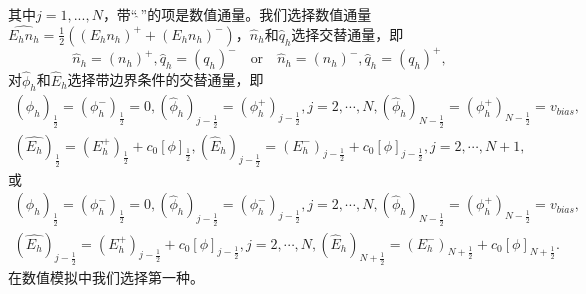 其中$j = 1,...,N$，带“$\widehat{\ }$”的项是数值通量。我们选择数值通量$\widehat{E_h n_h} = \frac{1}{2}((E_hn_h)^+  + (E_hn_h)^-)$，$\hat{n}_h$和$\hat{q}_h$选择交替通量，即
\begin{equation}
    \hat{n}_h = (n_h)^+, \hat{q}_h = (q_h)^- \quad \text{or} \quad \hat{n}_h = (n_h)^-, \hat{q}_h = (q_h)^+, \label{numbericalFlux:n&q}
\end{equation}
对$\hat{\phi}_h$和$\hat{E}_h$选择带边界条件的交替通量，即
\begin{equation}
    \begin{aligned}
        (\hat{\phi}_h)_{\frac{1}{2}} = (\phi_h^-)_{\frac{1}{2}} = 0, (\hat{\phi}_h)_{j-\frac{1}{2}} = (\phi_h^+)_{j-\frac{1}{2}},j = 2,\cdots,N,(\hat{\phi}_h)_{N-\frac{1}{2}} = (\phi_h^+)_{N-\frac{1}{2}} = v_{bias}, \\
        (\hat{E_h})_{\frac{1}{2}} = (E_h^+)_{\frac{1}{2}} + c_0[\phi]_{\frac{1}{2}}, (\hat{E}_h)_{j-\frac{1}{2}} = (E_h^-)_{j-\frac{1}{2}} + c_0[\phi]_{j-\frac{1}{2}},j = 2,\cdots,N+1,
    \end{aligned}\label{numbericalFlux:phi&E}
\end{equation}
或
\begin{equation}
    \begin{aligned}
        (\hat{\phi}_h)_{\frac{1}{2}} = (\phi_h^-)_{\frac{1}{2}} = 0, (\hat{\phi}_h)_{j-\frac{1}{2}} = (\phi_h^-)_{j-\frac{1}{2}},j = 2,\cdots,N,(\hat{\phi}_h)_{N-\frac{1}{2}} = (\phi_h^+)_{N-\frac{1}{2}} = v_{bias}, \\
        (\hat{E_h})_{j - \frac{1}{2}} = (E_h^+)_{j - \frac{1}{2}} + c_0[\phi]_{j-\frac{1}{2}},j = 2,\cdots,N, (\hat{E}_h)_{N+\frac{1}{2}} = (E_h^-)_{N+\frac{1}{2}} + c_0[\phi]_{N+\frac{1}{2}}.
    \end{aligned}\label{numbericalFlux:phi&E:alt}
\end{equation}
在数值模拟中我们选择第一种。
